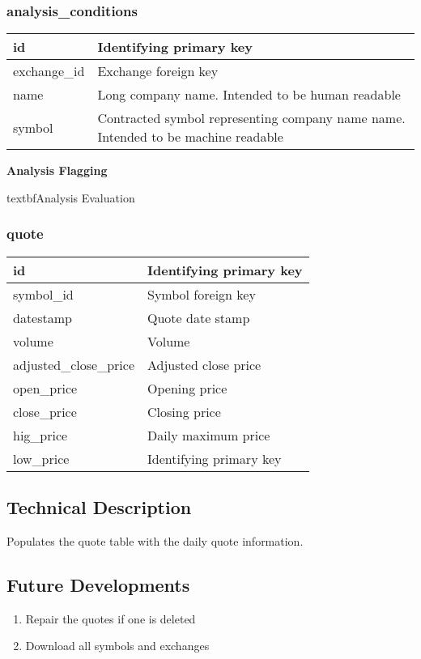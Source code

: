 \subsubsection{analysis\_conditions}
\begin{tabular}{|l||l|}
	\hline
	id 				& Identifying primary key \\ \hline
	exchange\_id 	& Exchange foreign key \\ \hline
	name 			& Long company name. Intended to be human readable \\ \hline
	symbol 			& Contracted symbol representing company name name. Intended to be machine readable \\ \hline
\end{tabular}
\par \textbf{Analysis Flagging}
\par textbf{Analysis Evaluation}
\subsubsection{quote}
\begin{tabular}{|l||l|}
	\hline
	id 						& Identifying primary key \\ \hline
	symbol\_id				& Symbol foreign key \\ \hline
	datestamp				& Quote date stamp \\ \hline
	volume					& Volume \\ \hline
	adjusted\_close\_price	& Adjusted close price \\ \hline
	open\_price				& Opening price \\ \hline
	close\_price				& Closing price \\ \hline
	hig\_price				& Daily maximum price \\ \hline
	low\_price				& Identifying primary key \\ \hline
\end{tabular}
\subsection{Technical Description}
Populates the quote table with the daily quote information.
\subsection{Future Developments}
\begin{enumerate}
	\item Repair the quotes if one is deleted
	\item Download all symbols and exchanges
\end{enumerate}
